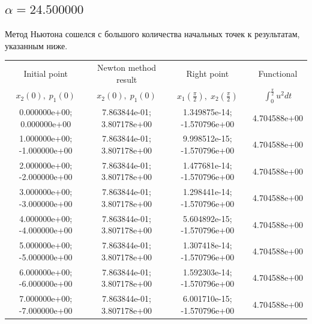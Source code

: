 \documentclass[titlepage]{article}
\def\l{\left}
\def\r{\right}
\begin{document}
\subsection{$\alpha = 24.500000$} 
Метод Ньютона сошелся с большого количества начальных точек к результатам, указанным ниже. \\ 
\begin{tabular}{ | c | c | c | c |} 
\hline 
Initial point  & Newton method result & Right point & Functional 
 \\ $x_2(0), \; p_1(0)$ & $x_2(0), \; p_1(0)$ & $x_1\l(\frac{\pi}{2}\r), \; x_2\l(\frac{\pi}{2}\r)$ & $\int_{0}^{\frac{\pi}{2}}u^2dt$  \\ \hline 
0.000000e+00; 0.000000e+00 & 7.863844e-01; 3.807178e+00 & 1.349875e-14; -1.570796e+00 & 4.704588e+00 \\ \hline 
1.000000e+00; -1.000000e+00 & 7.863844e-01; 3.807178e+00 & 9.998512e-15; -1.570796e+00 & 4.704588e+00 \\ \hline 
2.000000e+00; -2.000000e+00 & 7.863844e-01; 3.807178e+00 & 1.477681e-14; -1.570796e+00 & 4.704588e+00 \\ \hline 
3.000000e+00; -3.000000e+00 & 7.863844e-01; 3.807178e+00 & 1.298441e-14; -1.570796e+00 & 4.704588e+00 \\ \hline 
4.000000e+00; -4.000000e+00 & 7.863844e-01; 3.807178e+00 & 5.604892e-15; -1.570796e+00 & 4.704588e+00 \\ \hline 
5.000000e+00; -5.000000e+00 & 7.863844e-01; 3.807178e+00 & 1.307418e-14; -1.570796e+00 & 4.704588e+00 \\ \hline 
6.000000e+00; -6.000000e+00 & 7.863844e-01; 3.807178e+00 & 1.592303e-14; -1.570796e+00 & 4.704588e+00 \\ \hline 
7.000000e+00; -7.000000e+00 & 7.863844e-01; 3.807178e+00 & 6.001710e-15; -1.570796e+00 & 4.704588e+00 \\ \hline 
\end{tabular} 
\end{document}
